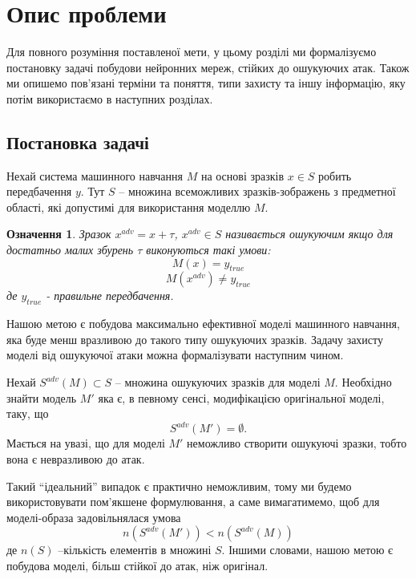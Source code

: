 \documentclass[14pt,a4paper]{extarticle}
\newcounter{e}
\newtheorem{defn}[theorem]{Означення}
\numberwithin{equation}{section}
\numberwithin{figure}{section}
\begin{document}
 
 \newpage
 \thispagestyle{empty}
 \section{Опис проблеми}
 
 Для повного розуміння поставленої мети, у цьому розділі ми формалізуємо постановку задачі побудови нейронних мереж, стійких до ошукуючих атак. Також ми опишемо пов'язані терміни та поняття, типи захисту та іншу інформацію, яку потім використаємо в наступних розділах.
 
 \subsection{Постановка задачі}
 
 Нехай система машинного навчання $M$ на основі зразків $x \in S$ робить передбачення $y$. Тут $S$ -- множина всеможливих зразків-зображень з предметної області, які допустимі для використання моделлю $M$.
 
 \begin{defn}
 	Зразок $x^{adv} = x + \tau$, $x^{adv} \in S$ називається ошукуючим якщо для достатньо малих збурень $\tau$ виконуються такі умови:  
 	\begin{equation}
	 	M(x) = y_{true}
	\end{equation}
	\begin{equation}
	 	M(x^{adv}) \neq y_{true}
 	\end{equation}
 	де $y_{true}$ - правильне передбачення. 
 \end{defn}
 
 Нашою метою є побудова максимально ефективної моделі машинного навчання, яка буде менш вразливою до такого типу ошукуючих зразків. Задачу захисту моделі від ошукуючої атаки можна формалізувати наступним чином.
 
 Нехай $S^{adv}(M) \subset S$ -- множина ошукуючих зразків для моделі $M$. Необхідно знайти модель $M'$ яка є, в певному сенсі, модифікацією оригінальної моделі, таку, що
 \begin{equation}
 	S^{adv}(M') = \emptyset.
 \end{equation}
 Мається на увазі, що для моделі $M'$ неможливо створити ошукуючі зразки, тобто вона є невразливою до атак. 

 Такий ``ідеальний'' випадок є практично неможливим, тому ми будемо використовувати пом'якшене формулювання, а саме вимагатимемо, щоб для моделі-образа задовільнялася умова
 \begin{equation}
 	n(S^{adv}(M')) < n(S^{adv}(M))
 \end{equation}
 де $n(S)$ --кількість елементів в множині $S$. Іншими словами, нашою метою є побудова моделі, більш стійкої до атак, ніж оригінал. 
 
\end{document}
